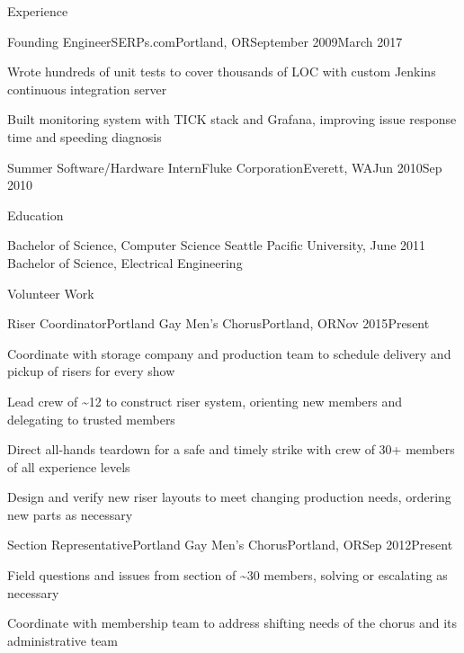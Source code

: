 \documentclass[letterpaper,10pt]{article}
\begin{document}
\begin{rsection}{Experience}
\begin{rexperienceitem}{Founding Engineer}{SERPs.com}{Portland, OR}{September 2009}{March 2017}
  \item Wrote hundreds of unit tests to cover thousands of LOC with custom Jenkins continuous integration server
  \item Built monitoring system with TICK stack and Grafana, improving issue response time and speeding diagnosis
\end{rexperienceitem}
\begin{rexperience}{Summer Software/Hardware Intern}{Fluke Corporation}{Everett, WA}{Jun 2010}{Sep 2010}
\end{rexperience}
\end{rsection}

\begin{rsection}{Education}
\begin{rcontent}{Bachelor of Science, Computer Science
  \textnormal{%
      \sffamily
      \normalsize
      \hfill
      Seattle Pacific University, June 2011}\\
  Bachelor of Science, Electrical Engineering
}
\end{rcontent}
\end{rsection}

\begin{rsection}{Volunteer Work}
  \begin{rexperienceitem}{Riser Coordinator}{Portland Gay Men's Chorus}{Portland, OR}{Nov 2015}{Present}
    \item Coordinate with storage company and production team to schedule delivery and pickup of risers for every show
    \item Lead crew of \textasciitilde12 to construct riser system, orienting new members and delegating to trusted members
    \item Direct all-hands teardown for a safe and timely strike with crew of 30+ members of all experience levels
    \item Design and verify new riser layouts to meet changing production needs, ordering new parts as necessary
  \end{rexperienceitem}
  \begin{rexperienceitem}{Section Representative}{Portland Gay Men's Chorus}{Portland, OR}{Sep 2012}{Present}
    \item Field questions and issues from section of \textasciitilde30 members, solving or escalating as necessary
    \item Coordinate with membership team to address shifting needs of the chorus and its administrative team
  \end{rexperienceitem}
\end{rsection}
\end{document}
